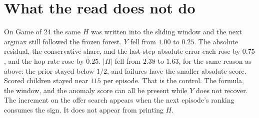 \documentclass[11pt,a4paper]{article}
\begin{document}
\section{What the read does not do}
On Game of 24 the same \(H\) was written into the sliding window and the next argmax still followed the frozen forest.
\(Y\) fell from \(1.00\) to \(0.25\).
The absolute residual, the conservative share, and the last-step absolute error each rose by \(0.75\), and the hop rate rose by \(0.25\).
\(|H|\) fell from \(2.38\) to \(1.63\), for the same reason as above: the prior stayed below \(1/2\), and failures have the smaller absolute score.
Scored children stayed near \(115\) per episode.
That is the control.
The formula, the window, and the anomaly score can all be present while \(Y\) does not recover.
The increment on the offer search appears when the next episode's ranking consumes the sign.
It does not appear from printing \(H\).
\end{document}
